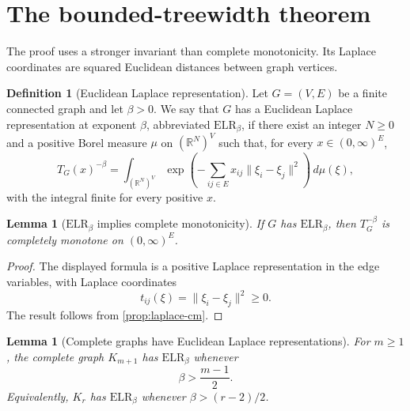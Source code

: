\documentclass[preprint,12pt,authoryear]{elsarticle}
\numberwithin{equation}{section}
\newtheorem{lemma}[theorem]{Lemma}
\theoremstyle{definition}
\newtheorem{definition}[theorem]{Definition}
\theoremstyle{remark}
\newcommand{\R}{\mathbb{R}}
\newcommand{\1}{\mathbf{1}}
\newcommand{\ELR}{\mathrm{ELR}}
\begin{document}
\section{The bounded-treewidth theorem}
\label{sec:bounded-treewidth}

The proof uses a stronger invariant than complete monotonicity.  Its Laplace coordinates are squared Euclidean distances between graph vertices.

\begin{definition}[Euclidean Laplace representation]
Let \(G=(V,E)\) be a finite connected graph and let \(\beta>0\).  We say that \(G\) has a Euclidean Laplace representation at exponent \(\beta\), abbreviated \(\ELR_\beta\), if there exist an integer \(N\ge0\) and a positive Borel measure \(\mu\) on \((\R^N)^V\) such that, for every \(x\in(0,\infty)^E\),
\begin{equation}
        T_G(x)^{-\beta}
        =
        \int_{(\R^N)^V}
        \exp\left(
        -\sum_{ij\in E}x_{ij}\|\xi_i-\xi_j\|^2
        \right)\,d\mu(\xi),
\end{equation}
with the integral finite for every positive \(x\).
\end{definition}

\begin{lemma}[\(\ELR_\beta\) implies complete monotonicity]
\label{lem:elr-cm}
If \(G\) has \(\ELR_\beta\), then \(T_G^{-\beta}\) is completely monotone on \((0,\infty)^E\).
\end{lemma}

\begin{proof}
The displayed formula is a positive Laplace representation in the edge variables, with Laplace coordinates
\begin{equation}
        t_{ij}(\xi)=\|\xi_i-\xi_j\|^2\ge0 .
\end{equation}
The result follows from \cref{prop:laplace-cm}.
\end{proof}

\begin{lemma}[Complete graphs have Euclidean Laplace representations]
\label{lem:complete-graph-elr}
For \(m\ge1\), the complete graph \(K_{m+1}\) has \(\ELR_\beta\) whenever
\begin{equation}
        \beta>\frac{m-1}{2}.
\end{equation}
Equivalently, \(K_r\) has \(\ELR_\beta\) whenever \(\beta>(r-2)/2\).
\end{lemma}
\end{document}
